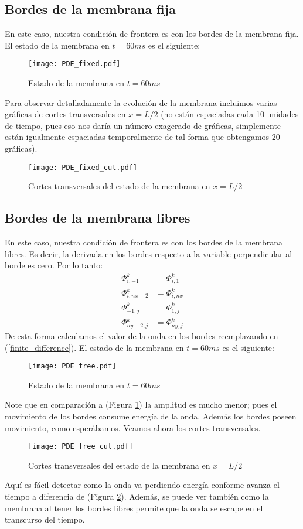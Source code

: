 \documentclass{article}
\begin{document}
	\subsection{Bordes de la membrana fija}
	En este caso, nuestra condición de frontera es con los bordes de la membrana fija. El estado de la membrana en $t=60ms$ es el siguiente:
	\begin{figure}[H]
		\centering
		\texttt{[image: PDE\_fixed.pdf]}
		\caption{Estado de la membrana en $t=60ms$}
		\label{fig:pdefixed}
	\end{figure}
	Para observar detalladamente la evolución de la membrana incluimos varias gráficas de cortes transversales en $x = L/2$ (no están espaciadas cada 10 unidades de tiempo, pues eso nos daría un número exagerado de gráficas, simplemente están igualmente espaciadas temporalmente de tal forma que obtengamos 20 gráficas). 
	\begin{figure}[H]
		\centering
		\texttt{[image: PDE\_fixed\_cut.pdf]}
		\caption{Cortes transversales del estado de la membrana en $x = L/2$}
		\label{fig:pdefixedtranscuts}
	\end{figure}
	\subsection{Bordes de la membrana libres}
	En este caso, nuestra condición de frontera es con los bordes de la membrana libres. Es decir, la derivada en los bordes respecto a la variable perpendicular al borde es cero. Por lo tanto:
	\begin{align*}
	\Phi_{i,-1}^k &= \Phi_{i,1}^k \\
	\Phi_{i,nx -2}^k &= \Phi_{i,nx}^k \\ 
	\Phi_{-1, j}^k &= \Phi_{1, j}^k \\ 
	\Phi_{ny - 2, j}^k &= \Phi_{ny, j}^k 
	\end{align*}
	De esta forma calculamos el valor de la onda en los bordes reemplazando en (\ref{finite_difference}). El estado de la membrana en $t=60ms$ es el siguiente:
	\begin{figure}[H]
		\centering
		\texttt{[image: PDE\_free.pdf]}
		\caption{Estado de la membrana en $t=60ms$}
		\label{fig:pdefree}
	\end{figure}
	Note que en comparación a (Figura \ref{fig:pdefixed}) la amplitud es mucho menor; pues el movimiento de los bordes consume energía de la onda. Además los bordes poseen movimiento, como esperábamos. Veamos ahora los cortes transversales.
	\begin{figure}[H]
		\centering
		\texttt{[image: PDE\_free\_cut.pdf]}
		\caption{Cortes transversales del estado de la membrana en $x = L/2$}
		\label{fig:pdefreetranscuts}
	\end{figure}
	Aquí es fácil detectar como la onda va perdiendo energía conforme avanza el tiempo a diferencia de (Figura \ref{fig:pdefixedtranscuts}). Además, se puede ver también como la membrana al tener los bordes libres permite que la onda se escape en el transcurso del tiempo.
\end{document}
